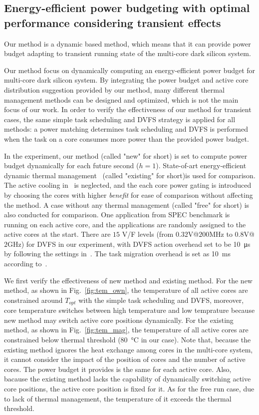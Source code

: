 \subsection{Energy-efficient power budgeting with optimal performance considering transient effects}
Our method is a dynamic based method, which means that it can provide power budget adapting to transient running state of the multi-core dark silicon system.

Our method focus on dynamically computing an energy-efficient power budget for multi-core dark silicon system. By integrating the power budget and active core distribution suggestion provided by our method, many different thermal management methods can be designed and optimized, which is not the main focus of our work. In order to verify the effectiveness of our method for transient cases, the same simple task scheduling and DVFS strategy is applied for all methods: a power matching determines task scheduling and DVFS is performed when the task on a core consumes more power than the provided power budget.

In the experiment, our method (called "new" for short) is set to compute power budget dynamically for each future second ($h=1$). State-of-art energy-efficient dynamic thermal management~\cite{Hanumaiah:TCOMP'14} (called "existing" for short)is used for comparison. The active cooling in~\cite{Hanumaiah:TCOMP'14} is neglected, and the each core power gating is introduced by choosing the cores with higher \emph{benefit} for ease of comparison without affecting the method. A case without any thermal management (called "free" for short) is also conducted for comparison. One application from SPEC benchmark is running on each active core, and the applications are randomly assigned to the active cores at the start. There are $15$ V/F levels (from $0.32$V@$200$MHz to $0.8$V@$2$GHz) for DVFS in our experiment, with DVFS action overhead set to be \SI{10}{\us} by following the settings in~\cite{Lu:MICRO'05}. The task migration overhead is set as \SI{10}{\ms} according to~\cite{Cuesta:ISVLSI'10}.

We first verify the effectiveness of new method and existing method. For the new method, as shown in Fig.~\ref{fig:tem_own}, the temperature of all active cores are constrained around $T_{opt}$ with the simple task scheduling and DVFS, moreover, core temperature switches between high temperature and low temprature because new method may switch active core positions dynamically. For the existing method, as shown in Fig.~\ref{fig:tem_mag}, the temperature of all active cores are constrained below thermal threshold (\SI{80}{\degreeCelsius} in our case). Note that, because the existing method ignores the heat exchange among cores in the multi-core system, it cannot consider the impact of the position of cores and 
the number of active cores. The power budget it provides is the same for each active core. Also, bacause the existing method lacks the capability of dynamically switching active core positions, the active core position is fixed for it. As for the free run case, due to lack of thermal management, the temperature of it exceeds the thermal threshold.

